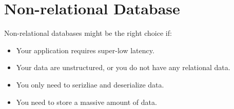 \documentclass[letterpaper, oneside]{book}
\begin{document}
\chapter{Non-relational Database}

Non-relational databases might be the right choice if:
\begin{itemize}
    \item Your application requires super-low latency.
    \item Your data are unstructured, or you do not have any relational data.
    \item You only need to serizliae and deserialize data.
    \item You need to store a massive amount of data.
\end{itemize}
\end{document}
